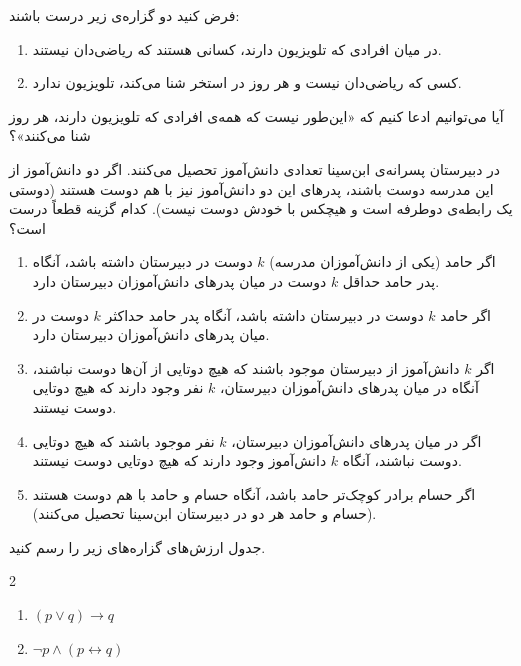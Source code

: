 \begin{problem} \label{loprtvmth}
	فرض کنید دو گزاره‌ی زیر درست باشند:
	\begin{enumerate}
		\item 
		در میان افرادی که تلویزیون دارند، کسانی هستند که ریاضی‌دان نیستند.
		\item 
		کسی که ریاضی‌دان نیست و هر روز در استخر شنا می‌کند، تلویزیون ندارد.
	\end{enumerate}
	آیا می‌توانیم ادعا کنیم که «این‌طور نیست که همه‌ی افرادی که تلویزیون دارند، هر روز شنا می‌کنند»؟
\end{problem}

\begin{problem} \label{loprdpesffs}
	در دبیرستان پسرانه‌ی ابن‌سینا تعدادی دانش‌آموز تحصیل می‌کنند. اگر دو دانش‌آموز از این مدرسه دوست باشند، پدرهای این دو دانش‌آموز نیز با هم دوست هستند (دوستی یک رابطه‌ی دوطرفه است و هیچکس با خودش دوست نیست). کدام گزینه قطعاً درست است؟
	\begin{enumerate}
		\item 
		اگر حامد (یکی از دانش‌آموزان مدرسه) $k$ دوست در دبیرستان داشته باشد، آنگاه پدر حامد حداقل $k$ دوست در میان پدرهای دانش‌آموزان دبیرستان دارد.
		\item 
		اگر حامد $k$ دوست در دبیرستان داشته باشد، آنگاه پدر حامد حداکثر $k$ دوست در میان پدرهای دانش‌آموزان دبیرستان دارد.
		\item 
		اگر $k$ دانش‌آموز از دبیرستان موجود باشند که هیچ دوتایی از آن‌ها دوست نباشند، آنگاه در میان پدرهای دانش‌آموزان دبیرستان، $k$ نفر وجود دارند که هیچ دوتایی دوست نیستند.
		\item 
		اگر در میان پدرهای دانش‌آموزان دبیرستان، $k$ نفر موجود باشند که هیچ دوتایی دوست نباشند، آنگاه $k$ دانش‌آموز وجود دارند که هیچ دوتایی دوست نیستند.
		\item 
		اگر حسام برادر کوچک‌تر حامد باشد، آنگاه حسام و حامد با هم دوست هستند (حسام و حامد هر دو در دبیرستان ابن‌سینا تحصیل می‌کنند).
	\end{enumerate}
\end{problem}

\begin{problem} \label{loprrttp}
	جدول ارزش‌های گزاره‌های زیر را رسم کنید.
	\vspace{-5mm}
	\begin{multicols}{2}
		\begin{enumerate}
			\item 
			$(p \vee q) \rightarrow q$
			\item 
			$\neg p \wedge (p \leftrightarrow q)$
		\end{enumerate}
	\end{multicols}
	\vspace{1pt}
\end{problem}

